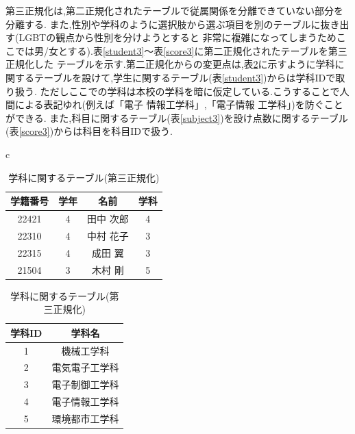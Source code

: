 \documentclass[a4j]{jarticle}
\begin{document}
          第三正規化は,第二正規化されたテーブルで従属関係を分離できていない部分を分離する.
          また,性別や学科のように選択肢から選ぶ項目を別のテーブルに抜き出す(LGBTの観点から性別を分けようとすると
          非常に複雑になってしまうためここでは男/女とする).表\ref{student3}～表\ref{score3}に第二正規化されたテーブルを第三正規化した
          テーブルを示す.第二正規化からの変更点は,表\ref{gakka3}に示すように学科に関するテーブルを設けて,学生に関するテーブル(表\ref{student3})からは学科IDで取り扱う.
          ただしここでの学科は本校の学科を暗に仮定している.こうすることで人間による表記ゆれ(例えば「電子 情報工学科」,「電子情報 工学科」)を防ぐことができる.
          また,科目に関するテーブル(表\ref{subject3})を設け点数に関するテーブル(表\ref{score3})からは科目を科目IDで扱う.
          \begin{table}[H]
            \begin{center}
              \begin{tabular}{c}

                \begin{minipage}{0.5\hsize}
            \caption{学生に関するテーブル(第三正規化)}
            \label{student3}
            \begin{center}
              \begin{tabular}{c|c|c|c}\hline
                学籍番号 & 学年 & 名前 & 学科 \\ \hline \hline
                22421 & 4 & 田中 次郎 & 4 \\ \hline
                22310 & 4 & 中村 花子 & 3 \\ \hline
                22315 & 4 & 成田 翼 & 3 \\ \hline
                21504 & 3 & 木村 剛 & 5 \\ \hline
               \end{tabular}
            \end{center}
          \end{minipage}

          \begin{minipage}{0.5\hsize}
            \caption{学科に関するテーブル(第三正規化)}
            \label{gakka3}
            \begin{center}
              \begin{tabular}{c|c}\hline
                学科ID & 学科名 \\ \hline \hline
                1 & 機械工学科 \\ \hline
                2 & 電気電子工学科 \\ \hline
                3 & 電子制御工学科 \\ \hline
                4 & 電子情報工学科 \\ \hline
                5 & 環境都市工学科 \\ \hline
               \end{tabular}
            \end{center}
          \end{minipage}
        \end{tabular}
      \end{center}
            \end{table}
\end{document}
